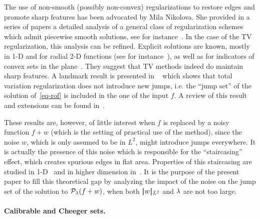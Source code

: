 The use of non-smooth (possibly non-convex) regularizations to restore edges and promote sharp features has been advocated by Mila Nikolova. She provided in a series of papers a detailed analysis of a general class of regularization schemes which admit piecewise smooth solutions, see for instance~\cite{NikolovaStrong00}. 
%
In the case of the TV regularization, this analysis can be refined. 
%
Explicit solutions are known, mostly in 1-D and for radial 2-D functions (see for instance~\cite{StrongExplicit96}), as well as for indicators of convex sets in the plane~\cite{alter2005evolution,Allard3}. They suggest that TV methods indeed do maintain sharp features.
%
A landmark result is presented in ~\cite{casdiscont07} which shows that total variation regularization does not introduce new jumps, i.e. the ``jump set'' of the solution of~\eqref{eq-rof} is included in the one of the input $f$. A review of this result and extensions can be found in~\cite{Valkonen15}.


These results are, however, of little interest when $f$ is replaced by a noisy function $f+w$ (which is the setting of practical use of the method), since the noise $w$, which is only assumed to be in $L^2$, might introduce jumps everywhere. It is actually the presence of this noise which is responsible for the ``staircasing'' effect, which 
creates spurious edges in flat area. Properties of this staircasing are studied in 1-D~\cite{Ring00} and in higher dimension in~\cite{Jalalzai2015}.  It is the purpose of the present paper to fill this theoretical gap by analyzing the impact of the noise on the jump set of the solution to $\mathcal{P}_\lambda(f+w)$, when both $|\!| w |\!|_{L^2}$ and $\lambda$ are not too large. 

\paragraph{Calibrable and Cheeger sets.} 

